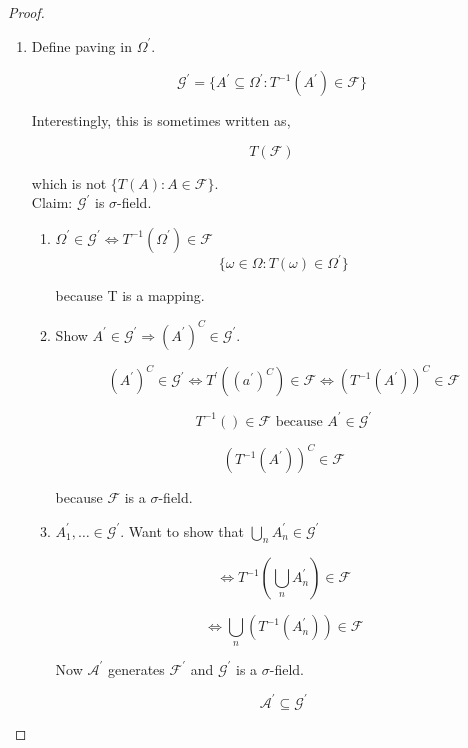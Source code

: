 \documentclass[11pt,fleqn]{book} %
\begin{document}
\begin{proof}

	\begin{enumerate}
		\item Define paving in $\Omega^\prime$. 

				$$\mathcal{G^\prime} = \{A^\prime \subseteq \Omega^\prime: T^{-1} (A^\prime) \in \mathcal{F}  \} $$

			Interestingly, this is sometimes written as, 
			
					$$ T(\mathcal{F})$$	

			which is not $\{T(A): A \in \mathcal{F}\}$.\\

			Claim: $\mathcal{G}^\prime$ is $\sigma$-field. 

					\begin{enumerate}
						\item $\Omega^\prime \in \mathcal{G}^\prime \Leftrightarrow T^{-1}(\Omega^\prime) \in \mathcal{F}$\\

								$$\{\omega\in \Omega: T(\omega) \in \Omega^\prime\} $$

							because T is a mapping. 

						\item Show $A^\prime \in \mathcal{G}^\prime \Rightarrow (A^\prime)^C \in \mathcal{G}^\prime$.

								$$(A^\prime)^C \in \mathcal{G^\prime} \Leftrightarrow T^\prime((a^\prime)^C) \in \mathcal{F} \Leftrightarrow (T^{-1} (A^\prime))^C \in \mathcal{F} $$

								$$T^{-1}() \in \mathcal{F} \text{ because } A^\prime \in \mathcal{G}^\prime$$

								$$(T^{-1}(A^\prime))^C \in \mathcal{F} $$

								because $\mathcal{F}$ is a $\sigma$-field. 


						\item $A_1^\prime, \dots \in \mathcal{G}^\prime$. Want to show that $\bigcup_n A_n^\prime \in \mathcal{G}^\prime$


								$$\Leftrightarrow T^{-1}(\bigcup_n A_n^\prime) \in \mathcal{F} $$

								$$\Leftrightarrow \bigcup_n(T^{-1} (A_n^\prime)) \in \mathcal{F} $$

								Now $\mathcal{A}^\prime$ generates $\mathcal{F}^\prime$ and $\mathcal{G}^\prime$ is a $\sigma$-field. 

										$$\mathcal{A}^\prime \subseteq \mathcal{G^\prime} $$


\end{enumerate}
\end{enumerate}
\end{proof}
\end{document}
